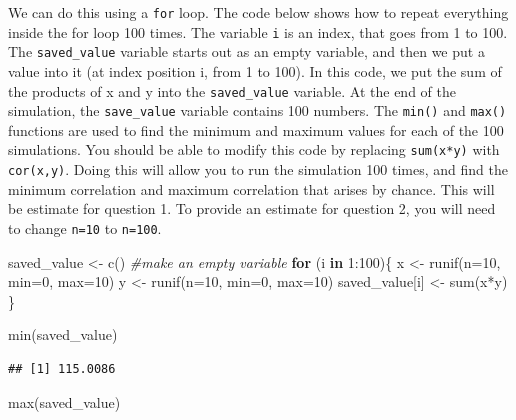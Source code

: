 \documentclass[
]{book}
\newenvironment{Shaded}{\begin{snugshade}}{\end{snugshade}}
\newcommand{\AttributeTok}[1]{\textcolor[rgb]{0.77,0.63,0.00}{#1}}
\newcommand{\CommentTok}[1]{\textcolor[rgb]{0.56,0.35,0.01}{\textit{#1}}}
\newcommand{\ControlFlowTok}[1]{\textcolor[rgb]{0.13,0.29,0.53}{\textbf{#1}}}
\newcommand{\DecValTok}[1]{\textcolor[rgb]{0.00,0.00,0.81}{#1}}
\newcommand{\FunctionTok}[1]{\textcolor[rgb]{0.00,0.00,0.00}{#1}}
\newcommand{\NormalTok}[1]{#1}
\newcommand{\OtherTok}[1]{\textcolor[rgb]{0.56,0.35,0.01}{#1}}
\newcommand{\SpecialCharTok}[1]{\textcolor[rgb]{0.00,0.00,0.00}{#1}}
\begin{document}
We can do this using a \texttt{for} loop. The code below shows how to repeat everything inside the for loop 100 times. The variable \texttt{i} is an index, that goes from 1 to 100. The \texttt{saved\_value} variable starts out as an empty variable, and then we put a value into it (at index position i, from 1 to 100). In this code, we put the sum of the products of x and y into the \texttt{saved\_value} variable. At the end of the simulation, the \texttt{save\_value} variable contains 100 numbers. The \texttt{min()} and \texttt{max()} functions are used to find the minimum and maximum values for each of the 100 simulations. You should be able to modify this code by replacing \texttt{sum(x*y)} with \texttt{cor(x,y)}. Doing this will allow you to run the simulation 100 times, and find the minimum correlation and maximum correlation that arises by chance. This will be estimate for question 1. To provide an estimate for question 2, you will need to change \texttt{n=10} to \texttt{n=100}.

\begin{Shaded}
\begin{Highlighting}[]
\NormalTok{saved\_value }\OtherTok{\textless{}{-}} \FunctionTok{c}\NormalTok{() }\CommentTok{\#make an empty variable}
\ControlFlowTok{for}\NormalTok{ (i }\ControlFlowTok{in} \DecValTok{1}\SpecialCharTok{:}\DecValTok{100}\NormalTok{)\{}
\NormalTok{  x }\OtherTok{\textless{}{-}} \FunctionTok{runif}\NormalTok{(}\AttributeTok{n=}\DecValTok{10}\NormalTok{, }\AttributeTok{min=}\DecValTok{0}\NormalTok{, }\AttributeTok{max=}\DecValTok{10}\NormalTok{)}
\NormalTok{  y }\OtherTok{\textless{}{-}} \FunctionTok{runif}\NormalTok{(}\AttributeTok{n=}\DecValTok{10}\NormalTok{, }\AttributeTok{min=}\DecValTok{0}\NormalTok{, }\AttributeTok{max=}\DecValTok{10}\NormalTok{)}
\NormalTok{  saved\_value[i] }\OtherTok{\textless{}{-}} \FunctionTok{sum}\NormalTok{(x}\SpecialCharTok{*}\NormalTok{y)}
\NormalTok{\}}

\FunctionTok{min}\NormalTok{(saved\_value)}
\end{Highlighting}
\end{Shaded}

\begin{verbatim}
## [1] 115.0086
\end{verbatim}

\begin{Shaded}
\begin{Highlighting}[]
\FunctionTok{max}\NormalTok{(saved\_value)}
\end{Highlighting}
\end{Shaded}
\end{document}
